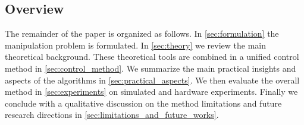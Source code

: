 \subsection{Overview}

The remainder of the paper is organized as follows. In 
\sect \ref{sec:formulation} the manipulation problem is formulated. In \sect \ref{sec:theory} we review the main theoretical background. These  theoretical tools are combined in a unified control method in \sect \ref{sec:control_method}. We summarize the main practical insights and aspects of the algorithms in \sect \ref{sec:practical_aspects}.
We then evaluate the overall method in \sect \ref{sec:experiments} on simulated and hardware experiments. Finally we conclude with a qualitative discussion on the method limitations and future research directions in \sect \ref{sec:limitations_and_future_works}.

